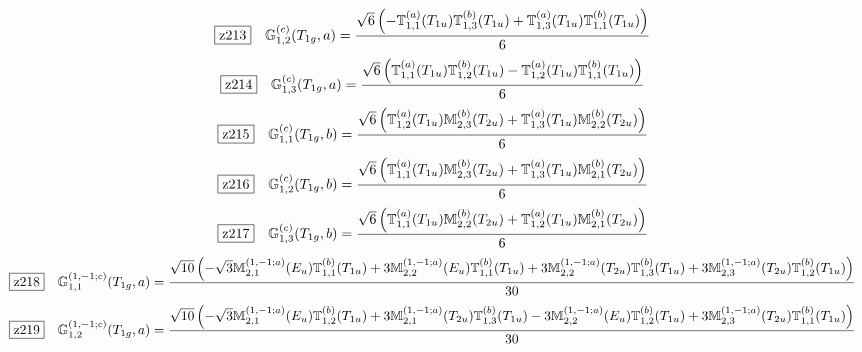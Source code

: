 \documentclass[fleqn,10pt,landscape]{jsarticle}
\begin{document}
\begin{dmath*}
\hspace*{3mm}\fbox{z213}\quad \mathbb{G}_{1,2}^{(c)}(T_{1g},a)=\frac{\sqrt{6} \left(- \mathbb{T}_{1,1}^{(a)}(T_{1u}) \mathbb{T}_{1,3}^{(b)}(T_{1u}) + \mathbb{T}_{1,3}^{(a)}(T_{1u}) \mathbb{T}_{1,1}^{(b)}(T_{1u})\right)}{6}
\end{dmath*}
\begin{dmath*}
\hspace*{3mm}\fbox{z214}\quad \mathbb{G}_{1,3}^{(c)}(T_{1g},a)=\frac{\sqrt{6} \left(\mathbb{T}_{1,1}^{(a)}(T_{1u}) \mathbb{T}_{1,2}^{(b)}(T_{1u}) - \mathbb{T}_{1,2}^{(a)}(T_{1u}) \mathbb{T}_{1,1}^{(b)}(T_{1u})\right)}{6}
\end{dmath*}
\begin{dmath*}
\hspace*{3mm}\fbox{z215}\quad \mathbb{G}_{1,1}^{(c)}(T_{1g},b)=\frac{\sqrt{6} \left(\mathbb{T}_{1,2}^{(a)}(T_{1u}) \mathbb{M}_{2,3}^{(b)}(T_{2u}) + \mathbb{T}_{1,3}^{(a)}(T_{1u}) \mathbb{M}_{2,2}^{(b)}(T_{2u})\right)}{6}
\end{dmath*}
\begin{dmath*}
\hspace*{3mm}\fbox{z216}\quad \mathbb{G}_{1,2}^{(c)}(T_{1g},b)=\frac{\sqrt{6} \left(\mathbb{T}_{1,1}^{(a)}(T_{1u}) \mathbb{M}_{2,3}^{(b)}(T_{2u}) + \mathbb{T}_{1,3}^{(a)}(T_{1u}) \mathbb{M}_{2,1}^{(b)}(T_{2u})\right)}{6}
\end{dmath*}
\begin{dmath*}
\hspace*{3mm}\fbox{z217}\quad \mathbb{G}_{1,3}^{(c)}(T_{1g},b)=\frac{\sqrt{6} \left(\mathbb{T}_{1,1}^{(a)}(T_{1u}) \mathbb{M}_{2,2}^{(b)}(T_{2u}) + \mathbb{T}_{1,2}^{(a)}(T_{1u}) \mathbb{M}_{2,1}^{(b)}(T_{2u})\right)}{6}
\end{dmath*}
\begin{dmath*}
\hspace*{3mm}\fbox{z218}\quad \mathbb{G}_{1,1}^{(1,-1;c)}(T_{1g},a)=\frac{\sqrt{10} \left(- \sqrt{3} \mathbb{M}_{2,1}^{(1,-1;a)}(E_{u}) \mathbb{T}_{1,1}^{(b)}(T_{1u}) + 3 \mathbb{M}_{2,2}^{(1,-1;a)}(E_{u}) \mathbb{T}_{1,1}^{(b)}(T_{1u}) + 3 \mathbb{M}_{2,2}^{(1,-1;a)}(T_{2u}) \mathbb{T}_{1,3}^{(b)}(T_{1u}) + 3 \mathbb{M}_{2,3}^{(1,-1;a)}(T_{2u}) \mathbb{T}_{1,2}^{(b)}(T_{1u})\right)}{30}
\end{dmath*}
\begin{dmath*}
\hspace*{3mm}\fbox{z219}\quad \mathbb{G}_{1,2}^{(1,-1;c)}(T_{1g},a)=\frac{\sqrt{10} \left(- \sqrt{3} \mathbb{M}_{2,1}^{(1,-1;a)}(E_{u}) \mathbb{T}_{1,2}^{(b)}(T_{1u}) + 3 \mathbb{M}_{2,1}^{(1,-1;a)}(T_{2u}) \mathbb{T}_{1,3}^{(b)}(T_{1u}) - 3 \mathbb{M}_{2,2}^{(1,-1;a)}(E_{u}) \mathbb{T}_{1,2}^{(b)}(T_{1u}) + 3 \mathbb{M}_{2,3}^{(1,-1;a)}(T_{2u}) \mathbb{T}_{1,1}^{(b)}(T_{1u})\right)}{30}
\end{dmath*}
\end{document}
